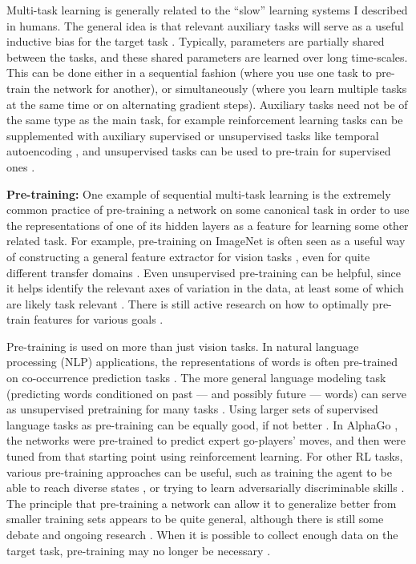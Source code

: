 Multi-task learning is generally related to the ``slow'' learning systems I described in humans. The general idea is that relevant auxiliary tasks will serve as a useful inductive bias for the target task \citep{Caruana1997}. Typically, parameters are partially shared between the tasks, and these shared parameters are learned over long time-scales. This can be done either in a sequential fashion (where you use one task to pre-train the network for another), or simultaneously (where you learn multiple tasks at the same time or on alternating gradient steps). Auxiliary tasks need not be of the same type as the main task, for example reinforcement learning tasks can be supplemented with auxiliary supervised or unsupervised tasks like temporal autoencoding \citep[e.g.][]{Hermann2017}, and unsupervised tasks can be used to pre-train for supervised ones \citep[e.g.][]{Wu2018}. \par
\textbf{Pre-training:} One example of sequential multi-task learning is the extremely common practice of pre-training a network on some canonical task in order to use the representations of one of its hidden layers as a feature for learning some other related task. For example, pre-training on ImageNet \citep{Deng2009} is often seen as a useful way of constructing a general feature extractor for vision tasks \citep{Huh2016}, even for quite different transfer domains \citep[e.g.][]{Marmanis2016}. Even unsupervised pre-training can be helpful, since it helps identify the relevant axes of variation in the data, at least some of which are likely task relevant \citep{Erhan2010}. There is still active research on how to optimally pre-train features for various goals \citep[e.g.][]{Wu2018}. \par    
Pre-training is used on more than just vision tasks. In natural language processing (NLP) applications, the representations of words is often pre-trained on co-occurrence prediction tasks \citep[e.g.][]{Pennington2014}. The more general language modeling task (predicting words conditioned on past --- and possibly future --- words) can serve as unsupervised pretraining for many tasks \citep[e.g.][]{Radford2019}. Using larger sets of supervised language tasks as pre-training can be equally good, if not better \citep{Raffel2019}. In AlphaGo \citep{Silver2016}, the networks were pre-trained to predict expert go-players' moves, and then were tuned from that starting point using reinforcement learning. For other RL tasks, various pre-training approaches can be useful, such as training the agent to be able to reach diverse states \citep{Gregor2016}, or trying to learn adversarially discriminable skills \citep{Eysenbach2019}. The principle that pre-training a network can allow it to generalize better from smaller training sets appears to be quite general, although there is still some debate and ongoing research \citep[e.g]{He2018}. When it is possible to collect enough data on the target task, pre-training may no longer be necessary \citep[e.g.][]{Silver2017}. \par
